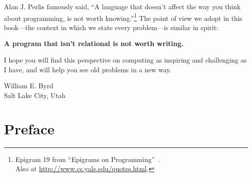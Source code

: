 Alan J. Perlis famously said, ``A language that doesn't affect the way you think about programming, is not worth knowing.''\footnote{Epigram 19 from ``Epigrams on Programming''~\cite{Perlis:1982:SFE:947955.1083808}.\\Also at \url{http://www.cs.yale.edu/quotes.html}.}
%
The point of view we adopt in this book---the context in which we
state every problem---is similar in spirit:

\vspace{-5mm}

\large
\begin{center}
{\bf A program that isn't relational is not worth writing.}
\end{center}
\normalsize

\vspace{-5mm}

I hope you will find this perspective on computing as inspiring and
challenging as I have, and will help you see old problems in a new way.


\wspace

\noindent
William E. Byrd\\
\noindent
Salt Lake City, Utah\\
\noindent
\monthyear





\chapter{Preface}\label{sec:preface}







